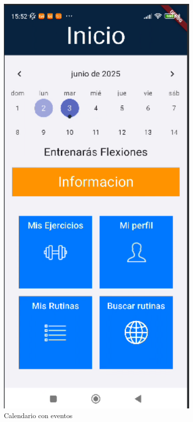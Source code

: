 \begin{figure}[H]
\begin{minipage}{0.4\textwidth}
   \end{minipage}%
   \hspace{0.5cm}
   \begin{minipage}{0.4\textwidth}
      \centering
      \includegraphics[width=0.9\textwidth]{pantallas/CalendarioEventos.png}
      \caption{Calendario con eventos}

\end{minipage}
\end{figure}
